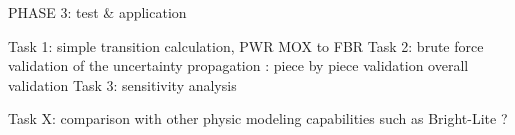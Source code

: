 \documentclass[dvips,12pt]{article}
\begin{document}
PHASE 3: test \& application

Task 1: simple transition calculation, PWR MOX to FBR
Task 2: brute force validation of the uncertainty propagation :
piece by piece validation
overall validation
Task 3: sensitivity analysis

Task X: comparison with other physic modeling capabilities such as Bright-Lite ?













\end{document}
